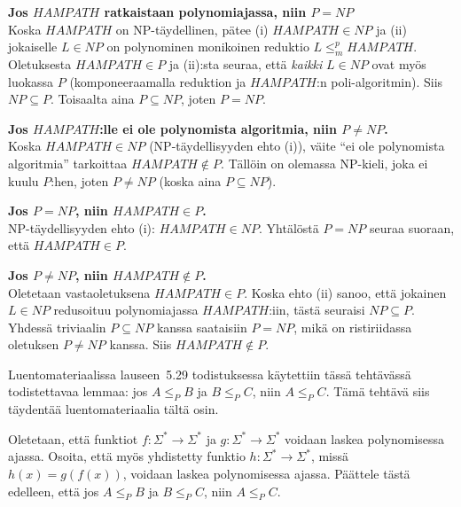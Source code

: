 \documentclass[12pt,a4paper]{article}
\begin{document}
\begin{alakohta}
\item %
\textbf{Jos $\mathit{HAMPATH}$ ratkaistaan polynomiajassa, niin $P=NP$}\\
Koska $\mathit{HAMPATH}$ on NP-täydellinen, pätee
(i) $\mathit{HAMPATH}\in NP$ ja
(ii) jokaiselle $L\in NP$ on polynominen monikoinen reduktio $L \le_m^p \mathit{HAMPATH}$.
Oletuksesta $\mathit{HAMPATH}\in P$ ja (ii):sta seuraa, että \emph{kaikki} $L\in NP$ ovat
myös luokassa $P$ (komponeeraamalla reduktion ja $\mathit{HAMPATH}$:n poli-algoritmin).
Siis $NP\subseteq P$. Toisaalta aina $P\subseteq NP$, joten $P=NP$.

\item %
\textbf{Jos $\mathit{HAMPATH}$:lle ei ole polynomista algoritmia, niin $P\neq NP$.}\\
Koska $\mathit{HAMPATH}\in NP$ (NP-täydellisyyden ehto (i)), väite “ei ole polynomista
algoritmia” tarkoittaa $\mathit{HAMPATH}\notin P$. Tällöin on olemassa NP-kieli, joka ei kuulu
$P$:hen, joten $P\neq NP$ (koska aina $P\subseteq NP$).

\item %
\textbf{Jos $P=NP$, niin $\mathit{HAMPATH}\in P$.}\\
NP-täydellisyyden ehto (i): $\mathit{HAMPATH}\in NP$. Yhtälöstä $P=NP$ seuraa
suoraan, että $\mathit{HAMPATH}\in P$.

\item %
\textbf{Jos $P\neq NP$, niin $\mathit{HAMPATH}\notin P$.}\\
Oletetaan vastaoletuksena $\mathit{HAMPATH}\in P$.
Koska ehto (ii) sanoo, että jokainen $L\in NP$ redusoituu polynomiajassa
$\mathit{HAMPATH}$:iin, tästä seuraisi $NP\subseteq P$.
Yhdessä triviaalin $P\subseteq NP$ kanssa saataisiin $P=NP$, mikä
on ristiriidassa oletuksen $P\neq NP$ kanssa.
Siis $\mathit{HAMPATH}\notin P$.
\end{alakohta}


\pagebreak
{} Luentomateriaalissa lauseen~5.29 todistuksessa käytettiin tässä tehtävässä todistettavaa lemmaa: jos $A\leq_P B$ ja $B\leq_P C$, niin $A\leq_P C$. Tämä tehtävä siis täydentää luentomateriaalia tältä osin.
  
Oletetaan, että funktiot
$f\colon\Sigma^\ast\rightarrow\Sigma^\ast$ ja
$g\colon\Sigma^\ast\rightarrow\Sigma^\ast$ 
voidaan laskea polynomisessa ajassa.
Osoita, että myös yhdistetty funktio
$h\colon\Sigma^\ast\rightarrow\Sigma^\ast$, missä $h(x)=g(f(x))$, 
voidaan laskea polynomisessa ajassa.
Päättele tästä edelleen, että jos
$A\leq_P B$ ja $B\leq_P C$, niin $A\leq_P C$.
\end{document}
